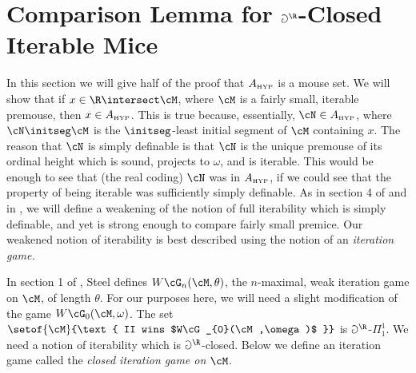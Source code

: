 
\skipbig

\section{Comparison Lemma for
$\protect{\Game^{\R}}$-Closed Iterable Mice}

\label{section:comparison}

In this section we will give half of the proof that $A_{\mbox{\tiny HYP}}$ is
a mouse set. We will show that if $x\in\R\intersect\cM$, where
$\cM$ is a fairly small, iterable premouse, then $x\in A_{\mbox{\tiny HYP}}$. This
is true because, essentially, $\cN\in\Ahyp$, where $\cN\initseg\cM$ is
the $\initseg$-least initial segment of $\cM$ containing $x$.
The reason that $\cN$ is simply
definable is that $\cN$ is the unique premouse
of its ordinal height which is sound, projects to $\omega$, and
is iterable. This would be enough to see that (the real coding)
$\cN$ was in $A_{\mbox{\tiny HYP}}$, if we could see that the property of being
iterable was sufficiently simply definable. As in section 4 of
\cite{Many_Woodins} and in \cite{Proj_WO_In_Mod}, we will define
a weakening of the notion of full iterability which is simply
definable, and yet is strong enough to compare fairly small premice.
Our weakened notion of iterability is best described using
the notion of an \emph{iteration game.}

In section 1 of \cite{Many_Woodins}, Steel defines
$W\cG_{n}(\cM,\theta)$, the $n$-maximal, weak iteration game on $\cM$, of
length $\theta$.
For our purposes here, we will need
a slight modification of the game $W\cG_{0}(\cM,\omega)$.
The set $\setof{\cM}{\text{ II wins $W\cG_{0}(\cM,\omega)$ }}$
is $\Game^{\R}$-$\Pi^1_1$. We need a notion of iterability which is
$\Game^{\R}$-closed. Below we define an iteration game called the
\emph{closed iteration game on $\cM$.}

